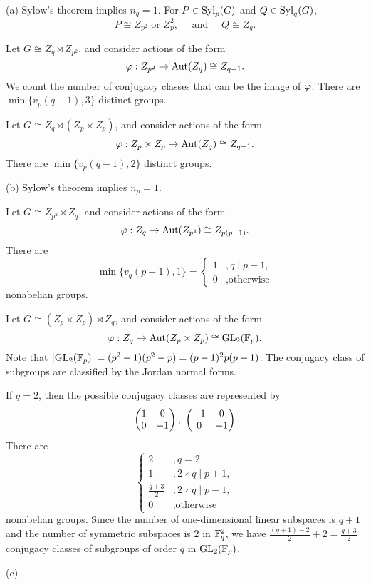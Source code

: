 \documentclass{../note}
\begin{document}
\begin{pf}
(a)
Sylow's theorem implies $n_q=1$.
For $P\in\operatorname{Syl}_p(G)$ and $Q\in\operatorname{Syl}_q(G)$,
\[P\cong Z_{p^2}\text{ or }Z_p^2,\quad\text{ and }\quad Q\cong Z_q.\]

Let $G\cong Z_q\rtimes Z_{p^2}$, and consider actions of the form
\[\varphi:Z_{p^2}\to\operatorname{Aut}(Z_q)\cong Z_{q-1}.\]
We count the number of conjugacy classes that can be the image of $\varphi$.
There are $\min\{v_p(q-1),3\}$ distinct groups.

Let $G\cong Z_q\rtimes(Z_p\times Z_p)$, and consider actions of the form
\[\varphi:Z_p\times Z_p\to\operatorname{Aut}(Z_q)\cong Z_{q-1}.\]
There are $\min\{v_p(q-1),2\}$ distinct groups.

(b)
Sylow's theorem implies $n_p=1$.
\begin{parts}
\item
Let $G\cong Z_{p^2}\rtimes Z_q$, and consider actions of the form
\[\varphi:Z_q\to\operatorname{Aut}(Z_{p^2})\cong Z_{p(p-1)}.\]
There are
\[\min\{v_q(p-1),1\}=\begin{cases}1&,q\mid p-1,\\0&,\text{otherwise}\end{cases}\]
nonabelian groups.
\item
Let $G\cong(Z_p\times Z_p)\rtimes Z_q$, and consider actions of the form
\[\varphi:Z_q\to\operatorname{Aut}(Z_p\times Z_p)\cong\mathrm{GL}_2(\mathbb{F}_p).\]
Note that $|\mathrm{GL}_2(\mathbb{F}_p)|=(p^2-1)(p^2-p)=(p-1)^2p(p+1)$.
The conjugacy class of subgroups are classified by the Jordan normal forms.

If $q=2$, then the possible conjugacy classes are represented by
\[\mat{1&0\\0&-1},\ \mat{-1&0\\0&-1}\]
There are
\[\begin{cases}2&,q=2\\1&,2\nmid q\mid p+1,\\\frac{q+3}2&,2\nmid q\mid p-1,\\0&,\text{otherwise}\end{cases}\]
nonabelian groups.
Since the number of one-dimensional linear subspaces is $q+1$ and the number of symmetric subspaces is 2 in $\mathbb{F}_q^2$, we have $\frac{(q+1)-2}2+2=\frac{q+3}2$ conjugacy classes of subgroups of order $q$ in $\mathrm{GL}_2(\mathbb{F}_p)$.
\end{parts}

(c)

\end{pf}



\begin{prb}
\end{prb}
\end{document}
